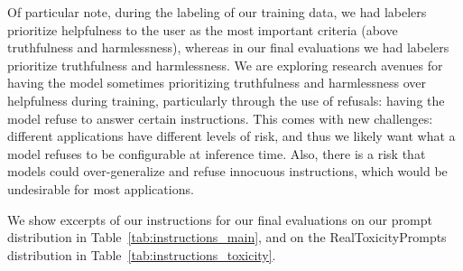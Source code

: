 \documentclass{article}
\begin{document}
Of particular note, during the labeling of our training data, we had labelers prioritize helpfulness to the user as the most important criteria (above truthfulness and harmlessness), whereas in our final evaluations we had labelers prioritize truthfulness and harmlessness. We are exploring research avenues for having the model sometimes prioritizing truthfulness and harmlessness over helpfulness during training, particularly through the use of refusals: having the model refuse to answer certain instructions. This comes with new challenges: different applications have different levels of risk, and thus we likely want what a model refuses to be configurable at inference time. Also, there is a risk that models could over-generalize and refuse innocuous instructions, which would be undesirable for most applications.

We show excerpts of our instructions for our final evaluations on our prompt distribution in Table~\ref{tab:instructions_main}, and on the RealToxicityPrompts distribution in Table~\ref{tab:instructions_toxicity}.
\end{document}
